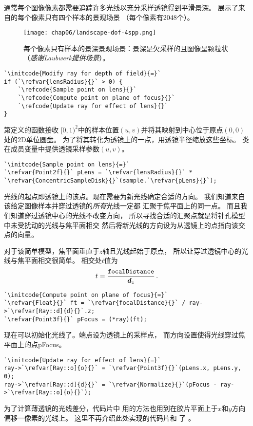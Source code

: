 通常每个图像像素都需要追踪许多光线以充分采样透镜得到平滑景深。
展示了来自的每个像素只有四个样本的景观场景
（每个像素有2048个）。
\begin{figure}[htbp]
    \centering\texttt{[image: chap06/landscape-dof-4spp.png]}
    \caption{每个像素只有样本的景深景观场景：景深是欠采样的且图像呈颗粒状（{\itshape 感谢Laubwerk提供场景}）。}
    \label{fig:6.13}
\end{figure}

\begin{lstlisting}
`\initcode{Modify ray for depth of field}{=}`
if (`\refvar{lensRadius}{}` > 0) {
    `\refcode{Sample point on lens}{}`
    `\refcode{Compute point on plane of focus}{}`
    `\refcode{Update ray for effect of lens}{}`
}
\end{lstlisting}

第定义的函数接收
$[0,1)^2$中的样本位置$(u,v)$并将其映射到中心位于原点$(0,0)$处的2D单位圆盘。
为了将其转化为透镜上的一点，用透镜半径缩放这些坐标。
类在成员变量中提供透镜采样参数$(u,v)$。
\begin{lstlisting}
`\initcode{Sample point on lens}{=}`
`\refvar{Point2f}{}` pLens = `\refvar{lensRadius}{}` * `\refvar{ConcentricSampleDisk}{}`(sample.`\refvar{pLens}{}`);
\end{lstlisting}

光线的起点即透镜上的该点。现在需要为新光线确定合适的方向。
我们知道来自该给定图像样本并穿过透镜的\emph{所有}光线一定都
汇聚于焦平面上的同一点。 而且我们知道穿过透镜中心的光线不改变方向，
所以寻找合适的汇聚点就是将针孔模型中未受扰动的光线与焦平面相交
然后将新光线的方向设为从透镜上的点指向该交点的向量。

对于该简单模型，焦平面垂直于$z$轴且光线起始于原点，
所以让穿过透镜中心的光线与焦平面相交很简单。
相交处$t$值为
\begin{align*}
    t=\frac{\text{\ttfamily focalDistance}}{{\bm d}_z}\, .
\end{align*}
\begin{lstlisting}
`\initcode{Compute point on plane of focus}{=}`
`\refvar{Float}{}` ft = `\refvar{focalDistance}{}` / ray->`\refvar[Ray::d]{d}{}`.z;
`\refvar{Point3f}{}` pFocus = (*ray)(ft);
\end{lstlisting}

现在可以初始化光线了。端点设为透镜上的采样点，
而方向设置使得光线穿过焦平面上的点{\ttfamily pFocus}。
\begin{lstlisting}
`\initcode{Update ray for effect of lens}{=}`
ray->`\refvar[Ray::o]{o}{}` = `\refvar{Point3f}{}`(pLens.x, pLens.y, 0);
ray->`\refvar[Ray::d]{d}{}` = `\refvar{Normalize}{}`(pFocus - ray->`\refvar[Ray::o]{o}{}`);
\end{lstlisting}

为了计算薄透镜的光线差分，代码片中
用的方法也用到在胶片平面上于$x$和$y$方向偏移一像素的光线上。
这里不再介绍此处实现的代码片和
了
。